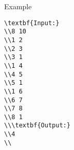 Example
\begin{verbatim}
\textbf{Input:}
\\8 10
\\1 2
\\2 3
\\3 1
\\1 4
\\4 5
\\5 1
\\1 6
\\6 7
\\7 8
\\8 1
\\\textbf{Output:}
\\4
\\\end{verbatim}